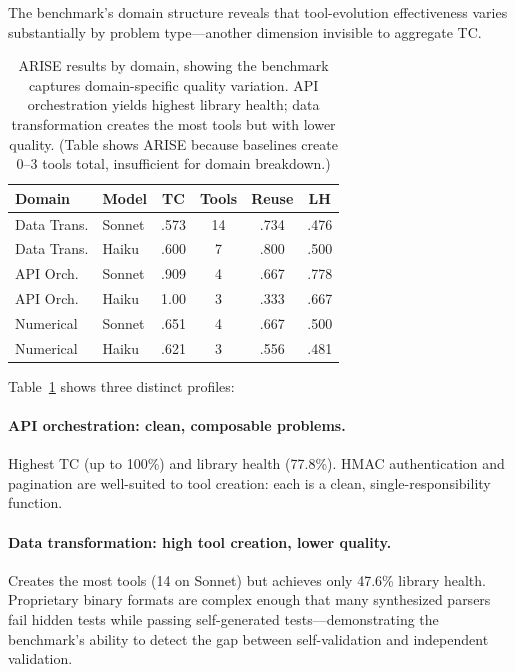 \documentclass[10pt,twocolumn]{article}
\begin{document}
The benchmark's domain structure reveals that tool-evolution effectiveness varies substantially by problem type---another dimension invisible to aggregate TC.

\begin{table}[t]
\centering
\footnotesize
\begin{tabular}{llcccc}
\toprule
\textbf{Domain} & \textbf{Model} & \textbf{TC} & \textbf{Tools} & \textbf{Reuse} & \textbf{LH} \\
\midrule
Data Trans. & Sonnet & .573 & 14 & .734 & .476 \\
Data Trans. & Haiku & .600 & 7 & .800 & .500 \\
\midrule
API Orch. & Sonnet & .909 & 4 & .667 & .778 \\
API Orch. & Haiku & 1.00 & 3 & .333 & .667 \\
\midrule
Numerical & Sonnet & .651 & 4 & .667 & .500 \\
Numerical & Haiku & .621 & 3 & .556 & .481 \\
\bottomrule
\end{tabular}
\caption{ARISE results by domain, showing the benchmark captures domain-specific quality variation. API orchestration yields highest library health; data transformation creates the most tools but with lower quality. (Table shows ARISE because baselines create 0--3 tools total, insufficient for domain breakdown.)}
\label{tab:domain}
\end{table}

Table~\ref{tab:domain} shows three distinct profiles:

\paragraph{API orchestration: clean, composable problems.} Highest TC (up to 100\%) and library health (77.8\%). HMAC authentication and pagination are well-suited to tool creation: each is a clean, single-responsibility function.

\paragraph{Data transformation: high tool creation, lower quality.} Creates the most tools (14 on Sonnet) but achieves only 47.6\% library health. Proprietary binary formats are complex enough that many synthesized parsers fail hidden tests while passing self-generated tests---demonstrating the benchmark's ability to detect the gap between self-validation and independent validation.
\end{document}
